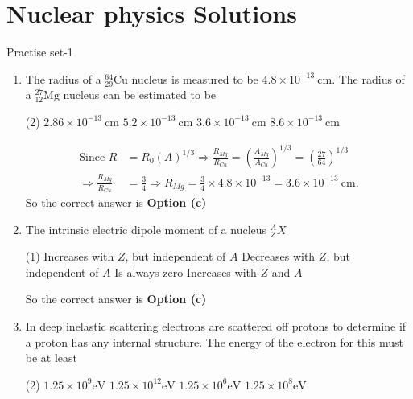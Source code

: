\chapter{Nuclear physics Solutions}
\begin{abox}
	Practise set-1
\end{abox}
\begin{enumerate}
	\item  The radius of a ${ }_{29}^{64} \mathrm{Cu}$ nucleus is measured to be $4.8 \times 10^{-13} \mathrm{~cm}$. The radius of a ${ }_{12}^{27} \mathrm{Mg}$ nucleus can be estimated to be
	\begin{tasks}(2)
		\task[\textbf{a.}]$2.86 \times 10^{-13} \mathrm{~cm}$
		\task[\textbf{b.}]$5.2 \times 10^{-13} \mathrm{~cm}$
		\task[\textbf{c.}] $3.6 \times 10^{-13} \mathrm{~cm}$
		\task[\textbf{d.}] $8.6 \times 10^{-13} \mathrm{~cm}$
	\end{tasks}
\begin{answer}
	\begin{align*}
\text{Since }R&=R_0(A)^{1 / 3} \Rightarrow \frac{R_{M g}}{R_{C u}}=\left(\frac{A_{M g}}{A_{C u}}\right)^{1 / 3}=\left(\frac{27}{64}\right)^{1 / 3}\\
	\Rightarrow \frac{R_{M g}}{R_{C u}}&=\frac{3}{4} \Rightarrow R_{M g}=\frac{3}{4} \times 4.8 \times 10^{-13}=3.6 \times 10^{-13} \mathrm{~cm} .
	\end{align*}
	So the correct answer is \textbf{Option (c)}
\end{answer}
	\item  The intrinsic electric dipole moment of a nucleus ${ }_Z^A X$
	\begin{tasks}(1)
		\task[\textbf{a.}]Increases with $Z$, but independent of $A$
		\task[\textbf{b.}]Decreases with $Z$, but independent of $A$
		\task[\textbf{c.}]Is always zero
		\task[\textbf{d.}]Increases with $Z$ and $A$
	\end{tasks}
\begin{answer}
So the correct answer is \textbf{Option (c)}
\end{answer}
	\item  In deep inelastic scattering electrons are scattered off protons to determine if a proton has any internal structure. The energy of the electron for this must be at least
	\begin{tasks}(2)
		\task[\textbf{a.}]$1.25 \times 10^9 \mathrm{eV}$
		\task[\textbf{b.}]$1.25 \times 10^{12} \mathrm{eV}$
		\task[\textbf{c.}] $1.25 \times 10^6 \mathrm{eV}$
		\task[\textbf{d.}] $1.25 \times 10^8 \mathrm{eV}$

\end{tasks}
\end{enumerate}
